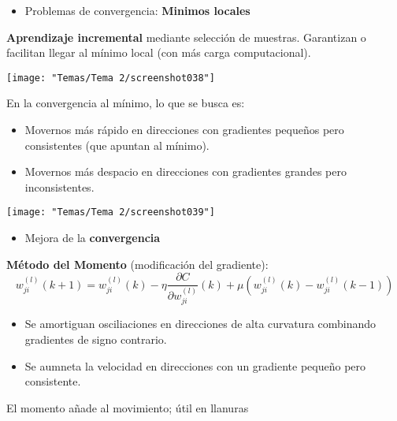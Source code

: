 \begin{minipage}{0.4\textwidth}
	\begin{itemize}[label=\color{red}\textbullet, leftmargin=*]
		\item \color{lightblue}Problemas de convergencia: \textbf{Minimos locales}
	\end{itemize}
	\textbf{Aprendizaje incremental} mediante selección de muestras. Garantizan o facilitan llegar al mínimo local (con más carga computacional).
\end{minipage}\qquad\begin{minipage}{0.6\textwidth}
\begin{center}
	\texttt{[image: "Temas/Tema 2/screenshot038"]}
\end{center}
\end{minipage}
En la convergencia al mínimo, lo que se busca es:
\begin{itemize}
	\item Movernos más rápido en direcciones con gradientes pequeños pero consistentes (que apuntan al mínimo).
	\item Movernos más despacio en direcciones con gradientes grandes pero inconsistentes.
\end{itemize}
\begin{center}
	\texttt{[image: "Temas/Tema 2/screenshot039"]}
\end{center}
\begin{itemize}[label=\color{red}\textbullet, leftmargin=*]
	\item \color{lightblue}Mejora de la \textbf{convergencia}
\end{itemize}
\textbf{Método del Momento} (modificación del gradiente): \[ w_{ji}^{(l)}(k+1)=w_{ji}^{(l)}(k)-\eta\dfrac{\partial C}{\partial w_{ji}^{(l)}}(k)+\mu\left(w_{ji}^{(l)}(k)-w_{ji}^{(l)}(k-1)\right) \]
\begin{itemize}
	\item Se amortiguan osciliaciones en direcciones de alta curvatura combinando gradientes de signo contrario.
	\item Se aumneta la velocidad en direcciones con un gradiente pequeño pero consistente.
\end{itemize}
El momento añade  al movimiento; útil en llanuras

